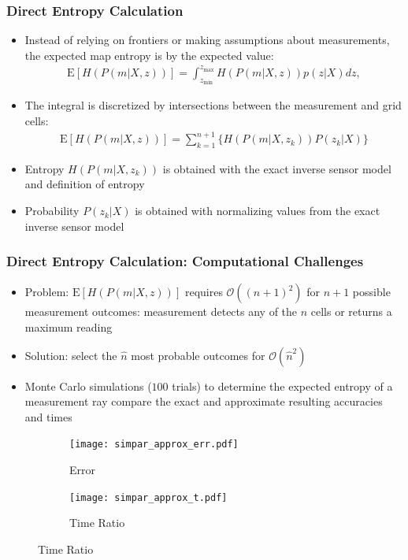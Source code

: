 \documentclass[11pt,professionalfonts,hyperref={pdftex,pdfpagemode=none,pdfstartview=FitH}]{beamer}
\renewcommand{\emph}[1]{\textit{\textbf{\color{blue}{#1}}}}
\begin{document}
\begin{frame}
\frametitle{Direct Entropy Calculation}
\begin{itemize}
        \item Instead of relying on frontiers or making assumptions about measurements, the expected map entropy is \emph{calculated directly} by the expected value:
	\begin{align*}
		\text{E}[H(P(m|X,z))]=\int_{z_\text{min}}^{z_\text{max}}
		H(P(m|X,z))p(z|X)dz,
	\end{align*}
	\pause
	\item The integral is discretized by intersections between the measurement and grid cells:
	\begin{align*}
		\text{E}[H(P(m|X,z))]=\sum_{k=1}^{n+1}\bigg\{H(P(m|X,z_k))P(z_{k}|X)\bigg\}
	\end{align*}
	\pause
	\item Entropy $H(P(m|X,z_k))$ is obtained with the exact inverse sensor model and definition of entropy
	\item Probability $P(z_{k}|X)$ is obtained with normalizing values from the exact inverse sensor model
\end{itemize}


\end{frame}


\begin{frame}
\frametitle{Direct Entropy Calculation: Computational Challenges}
\begin{itemize}
        \item Problem: $\text{E}[H(P(m|X,z))]$ requires $\mathcal O((n+1)^2)$ for $n+1$ possible measurement outcomes: measurement detects any of the $n$ cells or returns a maximum reading
        \pause
        \item Solution: select the $\hat n$ most probable outcomes for $\mathcal O(\hat n^2)$
        \pause
        \item Monte Carlo simulations ($100$ trials) to determine the expected entropy of a measurement ray compare the exact and approximate resulting accuracies and times
\end{itemize}

		\begin{figure}[!htbp]
		    \centering
		    \begin{subfigure}{0.5\textwidth}
		        \centering
		        \texttt{[image: simpar\_approx\_err.pdf]}
		        \caption*{Error}
		    \end{subfigure}
		    \hspace*{-0.1\textwidth}
		    \begin{subfigure}{0.5\textwidth}
		        \centering
		        \texttt{[image: simpar\_approx\_t.pdf]}
		        \caption*{Time Ratio}
		    \end{subfigure}
		\end{figure}

\end{frame}
\end{document}
